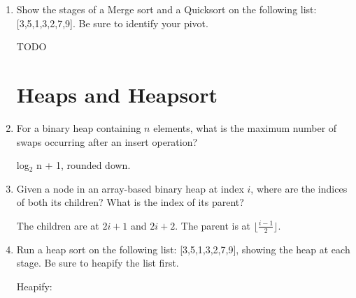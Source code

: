 \documentclass[11pt]{article}
\newenvironment{answer}{\large\lstset{basicstyle=\large}\color{white}}{}
\newenvironment{answer}{\large\lstset{basicstyle=\large}\color{red}}{}
\begin{document}
\begin{enumerate}
\pagebreak
\item Show the stages of a Merge sort and a Quicksort on the following list:
      [3,5,1,3,2,7,9]. Be sure to identify your pivot.

    \begin{answer}
    \Huge TODO
    \vspace{2in}
    \end{answer}

\section*{Heaps and Heapsort}

\item For a binary heap containing $n$ elements, what is the maximum number of
      swaps occurring after an insert operation?

    \begin{answer}
        log$_{\textrm{2}}$ n + 1, rounded down.
    \end{answer}

\item Given a node in an array-based binary heap at index $i$, where are the
      indices of both its children? What is the index of its parent?

    \begin{answer}
    The children are at $2i+1$ and $2i+2$. The parent is at
    $\lfloor\frac{i-1}{2}\rfloor$.

    \end{answer}

\item Run a heap sort on the following list: [3,5,1,3,2,7,9], showing the heap
      at each stage. Be sure to heapify the list first.

    \begin{answer}
        Heapify:  \newline
        	[\underline{3}, 5, 1, 3, 2, 7, 9]       \newline 
    	

\end{answer}
\end{enumerate}
\end{document}
